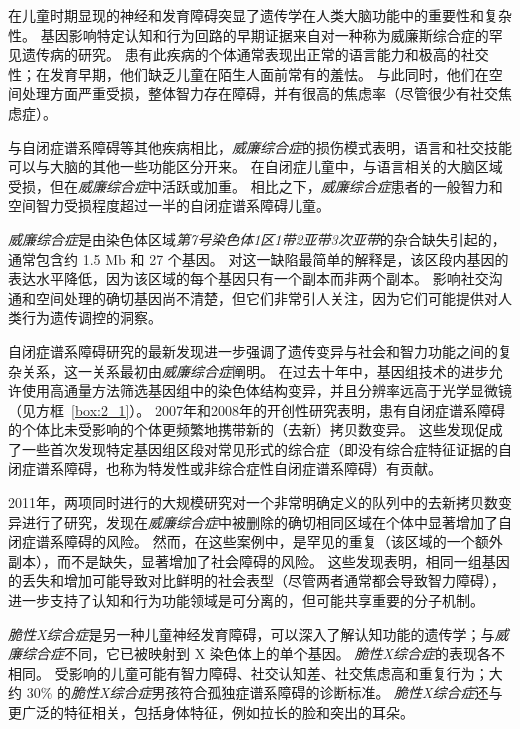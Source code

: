 在儿童时期显现的神经和发育障碍突显了遗传学在人类大脑功能中的重要性和复杂性。
基因影响特定认知和行为回路的早期证据来自对一种称为威廉斯综合症的罕见遗传病的研究。
患有此疾病的个体通常表现出正常的语言能力和极高的社交性；在发育早期，他们缺乏儿童在陌生人面前常有的羞怯。
与此同时，他们在空间处理方面严重受损，整体智力存在障碍，并有很高的焦虑率（尽管很少有社交焦虑症）。


与自闭症谱系障碍等其他疾病相比，\textit{威廉综合症}的损伤模式表明，语言和社交技能可以与大脑的其他一些功能区分开来。
在自闭症儿童中，与语言相关的大脑区域受损，但在\textit{威廉综合症}中活跃或加重。
相比之下，\textit{威廉综合症}患者的一般智力和空间智力受损程度超过一半的自闭症谱系障碍儿童。


\textit{威廉综合症}是由染色体区域\textit{第7号染色体1区1带2亚带3次亚带}的杂合缺失引起的，通常包含约 1.5 Mb 和 27 个基因。
对这一缺陷最简单的解释是，该区段内基因的表达水平降低，因为该区域的每个基因只有一个副本而非两个副本。
影响社交沟通和空间处理的确切基因尚不清楚，但它们非常引人关注，因为它们可能提供对人类行为遗传调控的洞察。



自闭症谱系障碍研究的最新发现进一步强调了遗传变异与社会和智力功能之间的复杂关系，这一关系最初由\textit{威廉综合症}阐明。
在过去十年中，基因组技术的进步允许使用高通量方法筛选基因组中的染色体结构变异，并且分辨率远高于光学显微镜（见方框~\ref{box:2_1}）。
2007年和2008年的开创性研究表明，患有自闭症谱系障碍的个体比未受影响的个体更频繁地携带新的（去新）拷贝数变异。
这些发现促成了一些首次发现特定基因组区段对常见形式的综合症（即没有综合症特征证据的自闭症谱系障碍，也称为特发性或非综合症性自闭症谱系障碍）有贡献。


2011年，两项同时进行的大规模研究对一个非常明确定义的队列中的去新拷贝数变异进行了研究，发现在\textit{威廉综合症}中被删除的确切相同区域在个体中显著增加了自闭症谱系障碍的风险。
然而，在这些案例中，是罕见的重复（该区域的一个额外副本），而不是缺失，显著增加了社会障碍的风险。
这些发现表明，相同一组基因的丢失和增加可能导致对比鲜明的社会表型（尽管两者通常都会导致智力障碍），进一步支持了认知和行为功能领域是可分离的，但可能共享重要的分子机制。



\textit{脆性X综合症}是另一种儿童神经发育障碍，可以深入了解认知功能的遗传学；与\textit{威廉综合症}不同，它已被映射到 X 染色体上的单个基因。
\textit{脆性X综合症}的表现各不相同。
受影响的儿童可能有智力障碍、社交认知差、社交焦虑高和重复行为；大约 30\% 的\textit{脆性X综合症}男孩符合孤独症谱系障碍的诊断标准。
\textit{脆性X综合症}还与更广泛的特征相关，包括身体特征，例如拉长的脸和突出的耳朵。



